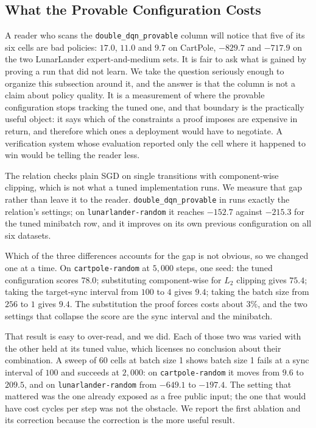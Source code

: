 \subsection{What the Provable Configuration Costs}
\label{subsec:provable-config}
\sloppy

A reader who scans the \texttt{double\_dqn\_provable} column will notice that
five of its six cells are bad policies: $17.0$, $11.0$ and $9.7$ on CartPole,
$-829.7$ and $-717.9$ on the two LunarLander expert-and-medium sets. It is fair
to ask what is gained by proving a run that did not learn. We take the question
seriously enough to organize this subsection around it, and the answer is that
the column is not a claim about policy quality. It is a measurement of where
the provable configuration stops tracking the tuned one, and that boundary is
the practically useful object: it says which of the constraints a proof imposes
are expensive in return, and therefore which ones a deployment would have to
negotiate. A verification system whose evaluation reported only the cell where
it happened to win would be telling the reader less.

The relation checks plain SGD on single transitions with component-wise
clipping, which is not what a tuned implementation runs. We measure that gap
rather than leave it to the reader. \texttt{double\_dqn\_provable} in
 runs exactly the relation's settings; on
\texttt{lunarlander-random} it reaches $-152.7$ against $-215.3$ for the tuned
minibatch row, and it improves on its own previous configuration on all six
datasets.

Which of the three differences accounts for the gap is not obvious, so we
changed one at a time. On \texttt{cartpole-random} at $5{,}000$ steps, one
seed: the tuned configuration scores $78.0$; substituting component-wise for
$L_2$ clipping gives $75.4$; taking the target-sync interval from $100$ to $4$
gives $9.4$; taking the batch size from $256$ to $1$ gives $9.4$. The
substitution the proof forces costs about $3\%$, and the two settings that
collapse the score are the sync interval and the minibatch.

That result is easy to over-read, and we did. Each of those two was varied with
the other held at its tuned value, which licenses no conclusion about their
combination. A sweep of $60$ cells at batch size 1 shows batch size 1 fails at
a sync interval of $100$ and succeeds at $2{,}000$: on \texttt{cartpole-random}
it moves from $9.6$ to $209.5$, and on \texttt{lunarlander-random} from
$-649.1$ to $-197.4$. The setting that mattered was the one already exposed as
a free public input; the one that would have cost cycles per step was not the
obstacle. We report the first ablation and its correction because the
correction is the more useful result.

